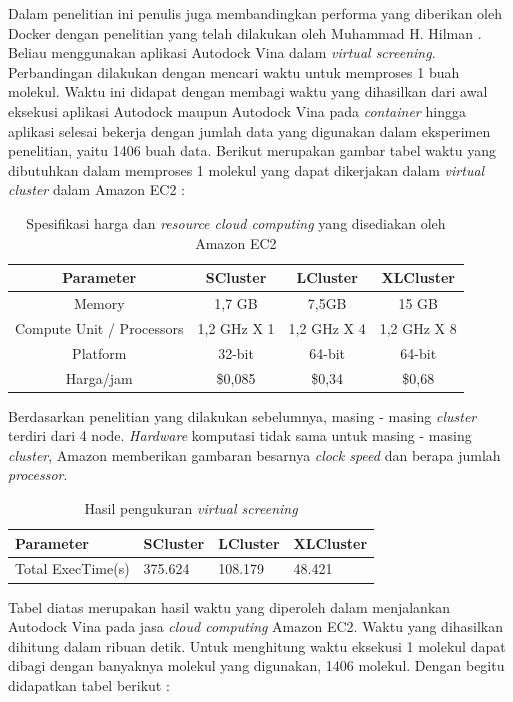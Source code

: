 Dalam penelitian ini penulis juga membandingkan performa yang diberikan oleh Docker dengan penelitian yang telah dilakukan oleh Muhammad H. Hilman \cite{cloud_pak hilman}. Beliau menggunakan aplikasi Autodock Vina dalam \textit{virtual screening}. Perbandingan dilakukan dengan mencari waktu untuk memproses 1 buah molekul. Waktu ini didapat dengan membagi waktu yang dihasilkan dari awal eksekusi aplikasi Autodock maupun Autodock Vina pada \textit{container} hingga aplikasi selesai bekerja dengan jumlah data yang digunakan dalam eksperimen penelitian, yaitu 1406 buah data. Berikut merupakan gambar tabel waktu yang dibutuhkan dalam memproses 1 molekul yang dapat dikerjakan dalam \textit{virtual cluster} dalam Amazon EC2 :
\begin{table}
	\centering
	\begin{tabular}{|c|c|c|c|}
		\hline
		Parameter & SCluster & LCluster & XLCluster \\ \hline
		Memory & 1,7 GB & 7,5GB & 15 GB \\ \hline
		Compute Unit / Processors & 1,2 GHz X 1 & 1,2 GHz X 4 & 1,2 GHz X 8 \\ \hline
		Platform & 32-bit & 64-bit & 64-bit \\ \hline
		Harga/jam & \$0,085 & \$0,34 & \$0,68 \\ \hline
	\end{tabular}
\caption{Spesifikasi harga dan \textit{resource cloud computing} yang disediakan oleh Amazon EC2 \cite{cloud_pak hilman}}
	\label{my-label}
\end{table}
Berdasarkan penelitian yang dilakukan sebelumnya, masing - masing \textit{cluster} terdiri dari 4 node. \textit{Hardware} komputasi tidak sama untuk masing - masing \textit{cluster}, Amazon memberikan gambaran besarnya \textit{clock speed} dan berapa jumlah \textit{processor}.  
\begin{table}
	\centering
	\begin{tabular}{|l|l|l|l|}
		\hline
		Parameter & SCluster & LCluster & XLCluster \\ \hline
		Total ExecTime(s) & 375.624 & 108.179 & 48.421 \\ \hline
	\end{tabular}
	\caption{Hasil pengukuran \textit{virtual screening} \cite{cloud_pak hilman}}
	\label{my-label}
\end{table}
Tabel diatas merupakan hasil waktu yang diperoleh dalam menjalankan Autodock Vina pada jasa \textit{cloud computing} Amazon EC2. Waktu yang dihasilkan dihitung dalam ribuan detik. Untuk menghitung waktu eksekusi 1 molekul dapat dibagi dengan banyaknya molekul yang digunakan, 1406 molekul. Dengan begitu didapatkan tabel berikut :
